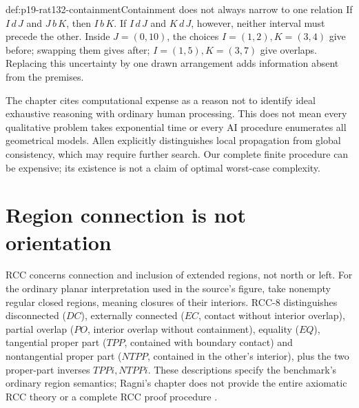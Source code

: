 \begin{hbexample}{def:p19-rat132-containment}{Containment does not always narrow to one relation}
If \(I\,d\,J\) and \(J\,b\,K\), then \(I\,b\,K\).
If \(I\,d\,J\) and \(K\,d\,J\), however, neither interval
must precede the other. Inside \(J=(0,10)\), the choices
\(I=(1,2),K=(3,4)\) give before; swapping them gives after;
\(I=(1,5),K=(3,7)\) give overlaps. Replacing this uncertainty
by one drawn arrangement adds information absent from the premises.
\end{hbexample}

The chapter cites computational expense as a reason not to identify ideal
exhaustive reasoning with ordinary human processing. This does not mean
every qualitative problem takes exponential time or every AI procedure
enumerates all geometrical models. Allen explicitly distinguishes local
propagation from global consistency, which may require further search.
Our complete finite procedure can be expensive; its existence is not a
claim of optimal worst-case complexity.

\section{Region connection is not orientation}
\label{sec:p19-rat132-regions}

RCC concerns connection and inclusion of extended regions, not north or
left. For the ordinary planar interpretation used in the source's figure,
take nonempty regular closed regions, meaning closures of their interiors.
RCC-8 distinguishes disconnected (\(DC\)), externally connected
(\(EC\), contact without interior overlap), partial overlap (\(PO\),
interior overlap without containment), equality (\(EQ\)), tangential
proper part (\(TPP\), contained with boundary contact) and
nontangential proper part (\(NTPP\), contained in the other's interior),
plus the two proper-part inverses \(TPPi,NTPPi\).
These descriptions specify the benchmark's ordinary region semantics;
Ragni's chapter does not provide the entire axiomatic RCC theory or a
complete RCC proof procedure \cite[pp.~726--727, fig.~13.2.1]{Ragni2021SpatialTemporal}.

